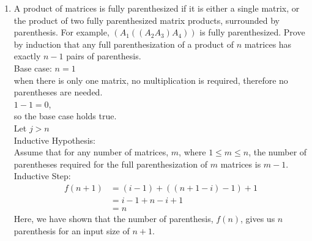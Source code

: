 \documentclass{article}
\begin{document}
\begin{enumerate}
\newpage 
\item A product of matrices is fully parenthesized if it is either a single matrix, or the product of two fully parenthesized matrix products, surrounded by parenthesis. For example, $(A_1((A_2A_3)A_4))$ is fully parenthesized. Prove by induction that any full parenthesization of a product of $n$ matrices has exactly $n-1$ pairs of parenthesis. \\
\newline
Base case: $n = 1$ \\
when there is only one matrix, no multiplication is required, therefore no parentheses are needed. \\
$1 - 1 = 0$, \\
so the base case holds true. \\
\newline 
Let $j > n$ \\
\newline
Inductive Hypothesis: \\
Assume that for any number of matrices, $m$, where $1 \leq m \leq n$, the number of parentheses required for the full parenthesization of $m$ matrices is $m-1$. \\
\newline 
Inductive Step:
\begin{align*}
    f(n+1) & = (i-1) + ((n + 1 - i) - 1) + 1 \\
    & = i - 1 + n - i + 1 \\ 
    & = n
\end{align*}
Here, we have shown that the number of parenthesis, $f(n)$, gives us $n$ parenthesis for an input size of $n+1$.








\end{enumerate}
\end{document}
